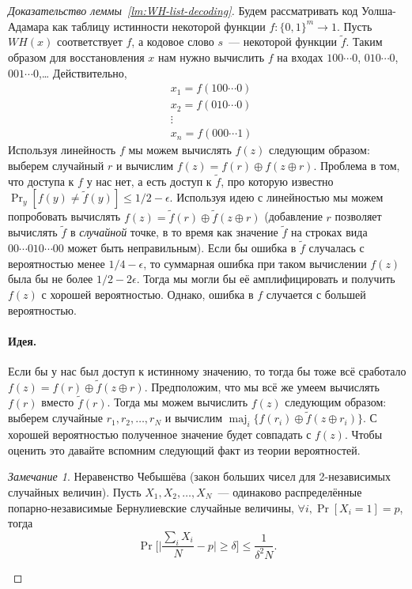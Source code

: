 \documentclass[12pt,a4paper]{article}
\DeclareMathOperator*{\maj}{maj}
\theoremstyle{definition}
\theoremstyle{plain}
\theoremstyle{remark}
\newtheorem{remark}{Замечание}[section]
\begin{document}
\begin{proof}[Доказательство леммы~\ref*{lm:WH-list-decoding}]
Будем рассматривать код Уолша-Адамара как таблицу истинности некоторой функции $f:\{0,1\}^m\to 1$.
Пусть $WH(x)$ соответствует $f$, а кодовое слово $s$~--- некоторой функции $\tilde{f}$. Таким 
образом для восстановления $x$ нам нужно вычислить $f$ на входах $100\dotsb0$, $010\dotsb0$, $001\dotsb0$,\ldots
Действительно, 
$$
\begin{aligned}
&x_1 = f(100\dotsb0)\\
&x_2 = f(010\dotsb0)\\
&\vdots\\
&x_n = f(000\dotsb 1)
\end{aligned}
$$
Используя линейность $f$ мы можем вычислять $f(z)$ следующим образом: 
выберем случайный $r$ и вычислим $f(z) = f(r) \oplus f(z \oplus r)$. Проблема в том,
что доступа к $f$ у нас нет, а есть доступ к $\tilde{f}$, про которую известно
$\Pr_y[f(y) \neq \tilde{f}(y)]\le 1/2 - \epsilon.$
Используя идею с линейностью мы можем попробовать вычислять 
$f(z) = \tilde{f}(r) \oplus \tilde{f}(z \oplus r)$ (добавление $r$ позволяет вычислять
$\tilde{f}$ в \emph{случайной} точке, в то время как значение $\tilde{f}$
на строках вида $00\cdots010\cdots00$ может быть неправильным).
Если бы ошибка в $\tilde{f}$ случалась с вероятностью менее $1/4-\epsilon$,
то суммарная ошибка при таком вычислении $f(z)$ была бы не более $1/2 - 2\epsilon$.
Тогда мы могли бы её амплифицировать и получить $f(z)$ с хорошей вероятностью.
Однако, ошибка в $f$ случается с большей вероятностью.

\paragraph{Идея.} Если бы у нас был доступ к истинному значению, то тогда бы тоже всё сработало
$f(z) = f(r) \oplus \tilde{f}(z \oplus r)$. Предположим, 
что мы всё же умеем вычислять $f(r)$ вместо $\tilde{f}(r)$. Тогда мы можем вычислить $f(z)$ 
следующим образом: выберем случайные $r_1,r_2,\dotsc,r_N$ 
и вычислим $\maj_i\{f(r_i) \oplus \tilde{f}(z \oplus r_i)\}$.
С хорошей вероятностью полученное значение будет совпадать с $f(z)$. Чтобы оценить это давайте вспомним следующий
факт из теории вероятностей.

\begin{remark}{Неравенство Чебышёва (закон больших чисел для 2-независимых случайных величин).}
Пусть $X_1,X_2,\dotsc,X_N$~--- одинаково распределённые попарно-независимые 
Бернулиевские случайные величины, $\forall i, \Pr[X_i = 1] = p$, тогда
$$\Pr\Biggl[ \biggl|\frac{\sum_i X_i}{N} - p\biggr| \ge \delta \Biggr]\le \frac{1}{\delta^2 N}.$$
\end{remark}


\end{proof}
\end{document}
